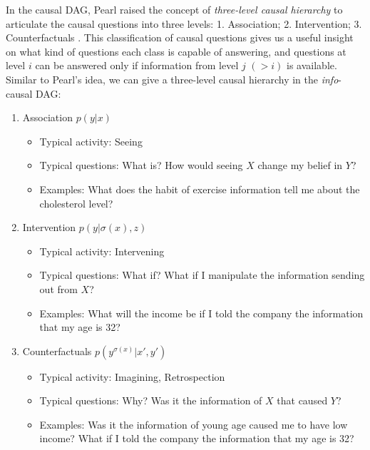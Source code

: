 In the causal DAG, Pearl raised the concept of \emph{three-level causal hierarchy} to articulate the causal questions into three levels: 1. Association; 2. Intervention; 3. Counterfactuals \cite{Pearl2019seven}. 
This classification of causal questions gives us a useful insight on what kind of questions each class is capable of answering, and questions at level $i$ can be answered only if information from level $j$ $(>i)$ is available.
Similar to Pearl's idea, we can give a  three-level causal hierarchy in the \emph{info}-causal DAG:
\begin{enumerate}[1.]
	\setlength{\itemsep}{-1pt}
	\item Association $p(y|x)$
	\begin{itemize}
		\setlength{\itemsep}{0pt}		
		\item Typical activity: Seeing
		\item Typical questions: What is? How would seeing $X$ change my belief in $Y$?
		\item Examples: What does the habit of exercise information tell me about the cholesterol level? 
	\end{itemize}
	\item Intervention $p(y|\sigma(x), z)$
	\begin{itemize}
		\setlength{\itemsep}{0pt}		
		\item Typical activity: Intervening
		\item Typical questions: What if?  What if I manipulate the information sending out from $X$?
		\item Examples: What will the income be if I told the company the information that my age is 32?
	\end{itemize}
	\item Counterfactuals $p(y^{\sigma(x) }|x', y')$
	\begin{itemize}
		\setlength{\itemsep}{0pt}		
		\item Typical activity: Imagining, Retrospection
		\item Typical questions: Why?  Was it the information of $X$ that caused $Y$? 
		\item Examples: Was it the information of young age caused me to have low income?  What if I told the company the information that my age is 32? 
	\end{itemize}
\end{enumerate}

